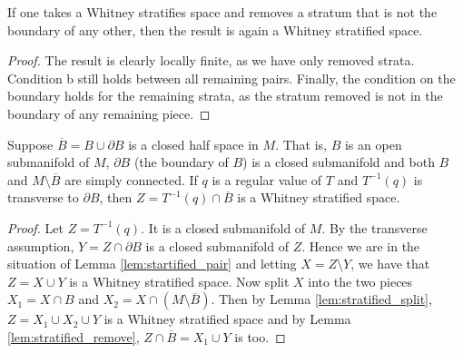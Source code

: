 \begin{lem}
    \label{lem:stratified_remove}
If one takes a Whitney stratifies space and removes a stratum that is not the boundary of any other, then the result is again a Whitney stratified space.

\begin{proof}
The result is clearly locally finite, as we have only removed strata. Condition b still holds between all remaining pairs. Finally, the condition on the boundary holds for the remaining strata, as the stratum removed is not in the boundary of any remaining piece.
\end{proof}
\end{lem}






\begin{lem}
    \label{lem:stratified_level_set}
Suppose $\overline B = B \cup \partial B$ is a closed half space in $M$. That is, $B$ is an open submanifold of $M$, $\partial B$ (the boundary of $B$) is a closed submanifold and both $B$ and $M\setminus \overline{B}$ are simply connected. If $q$ is a regular value of $T$ and $T^{-1}(q)$ is transverse to $\partial B$, then $Z = T^{-1}(q) \cap \overline B$ is a Whitney stratified space.

\begin{proof}
Let $Z = T^{-1}(q)$. It is a closed submanifold of $M$. By the transverse assumption, $Y = Z\cap \partial B$ is a closed submanifold of $Z$. Hence we are in the situation of Lemma \ref{lem:startified_pair} and letting $X = Z\setminus Y$, we have that $Z = X \cup Y$ is a Whitney stratified space. Now split $X$ into the two pieces $X_1 = X \cap B$ and $X_2 = X \cap (M \setminus \overline{B})$. Then by Lemma \ref{lem:stratified_split}, $Z = X_1 \cup X_2 \cup Y$ is a Whitney stratified space and by Lemma \ref{lem:stratified_remove}, $Z \cap \overline{B} = X_1 \cup Y$ is too.
\end{proof}
\end{lem}


